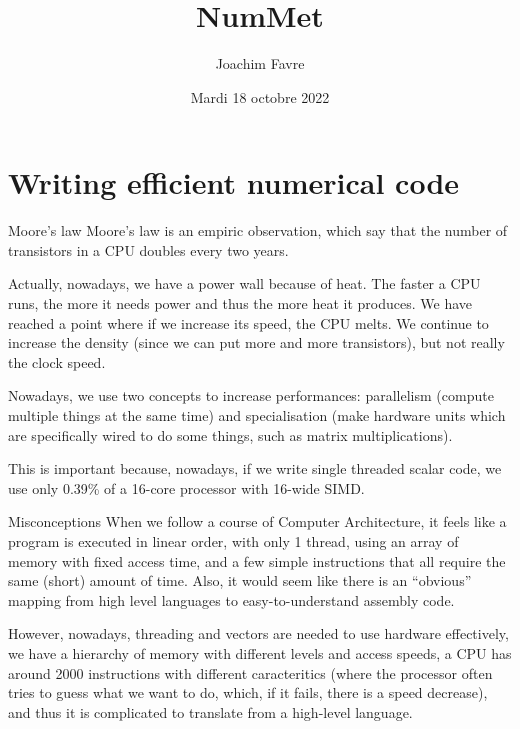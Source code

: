 \documentclass[a4paper]{article}
\title{NumMet}
\author{Joachim Favre}
\date{Mardi 18 octobre 2022}
\begin{document}
\maketitle


\section{Writing efficient numerical code}
\begin{parag}{Moore's law}
    Moore's law is an empiric observation, which say that the number of transistors in a CPU doubles every two years.

    Actually, nowadays, we have a power wall because of heat. The faster a CPU runs, the more it needs power and thus the more heat it produces. We have reached a point where if we increase its speed, the CPU melts. We continue to increase the density (since we can put more and more transistors), but not really the clock speed.

    Nowadays, we use two concepts to increase performances: parallelism (compute multiple things at the same time) and specialisation (make hardware units which are specifically wired to do some things, such as matrix multiplications).

    This is important because, nowadays, if we write single threaded scalar code, we use only 0.39\% of a 16-core processor with 16-wide SIMD.
\end{parag}

\begin{parag}{Misconceptions}
    When we follow a course of Computer Architecture, it feels like a program is executed in linear order, with only 1 thread, using an array of memory with fixed access time, and a few simple instructions that all require the same (short) amount of time. Also, it would seem like there is an ``obvious'' mapping from high level languages to easy-to-understand assembly code.

    However, nowadays, threading and vectors are needed to use hardware effectively, we have a hierarchy of memory with different levels and access speeds, a CPU has around 2000 instructions with different caracteritics (where the processor often tries to guess what we want to do, which, if it fails, there is a speed decrease), and thus it is complicated to translate from a high-level language.
\end{parag}
\end{document}
